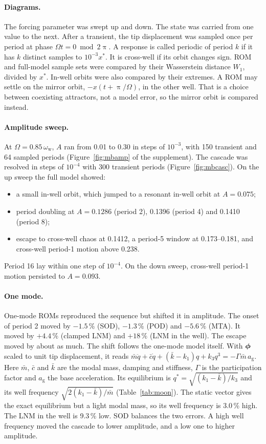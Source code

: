 \documentclass[preprint,12pt]{elsarticle}
\begin{document}
\paragraph{Diagrams.} The forcing parameter was swept up and down. The state was carried from one value to the next. After a transient, the tip displacement was sampled once per period at phase $\varOmega t=0 \bmod 2\uppi$. A response is called periodic of period $k$ if it has $k$ distinct samples to $10^{-3}x^*$. It is cross-well if its orbit changes sign. ROM and full-model sample sets were compared by their Wasserstein distance $W_1$, divided by $x^*$. In-well orbits were also compared by their extremes. A ROM may settle on the mirror orbit, $-x(t+\uppi/\varOmega)$, in the other well. That is a choice between coexisting attractors, not a model error, so the mirror orbit is compared instead.

\paragraph{Amplitude sweep.} At $\varOmega=0.85\,\omega_{\mathrm w}$, $A$ ran from 0.01 to 0.30 in steps of $10^{-3}$, with 150 transient and 64 sampled periods (Figure~\ref{fig:mbamp} of the supplement). The cascade was resolved in steps of $10^{-4}$ with 300 transient periods (Figure~\ref{fig:mbcasc}). On the up sweep the full model showed:
\begin{itemize}
\item a small in-well orbit, which jumped to a resonant in-well orbit at $A=0.075$;
\item period doubling at $A=0.1286$ (period 2), 0.1396 (period 4) and 0.1410 (period 8);
\item escape to cross-well chaos at 0.1412, a period-5 window at 0.173--0.181, and cross-well period-1 motion above 0.238.
\end{itemize}
Period 16 lay within one step of $10^{-4}$. On the down sweep, cross-well period-1 motion persisted to $A=0.093$.

\paragraph{One mode.} One-mode ROMs reproduced the sequence but shifted it in amplitude. The onset of period 2 moved by $-1.5\,\%$ (SOD), $-1.3\,\%$ (POD) and $-5.6\,\%$ (MTA). It moved by $+4.4\,\%$ (clamped LNM) and $+18\,\%$ (LNM in the well). The escape moved by about as much. The shift follows the one-mode model itself. With $\bm{\phi}$ scaled to unit tip displacement, it reads $\bar m\ddot q+\bar c\dot q+(\bar k-k_1)q+k_3q^3=-\varGamma\bar m\,a_{\mathrm g}$. Here $\bar m$, $\bar c$ and $\bar k$ are the modal mass, damping and stiffness, $\varGamma$ is the participation factor and $a_{\mathrm g}$ the base acceleration. Its equilibrium is $q^*=\sqrt{(k_1-\bar k)/k_3}$ and its well frequency $\sqrt{2(k_1-\bar k)/\bar m}$ (Table~\ref{tab:moon}). The static vector gives the exact equilibrium but a light modal mass, so its well frequency is 3.0\,\% high. The LNM in the well is 9.3\,\% low. SOD balances the two errors. A high well frequency moved the cascade to lower amplitude, and a low one to higher amplitude.
\end{document}
